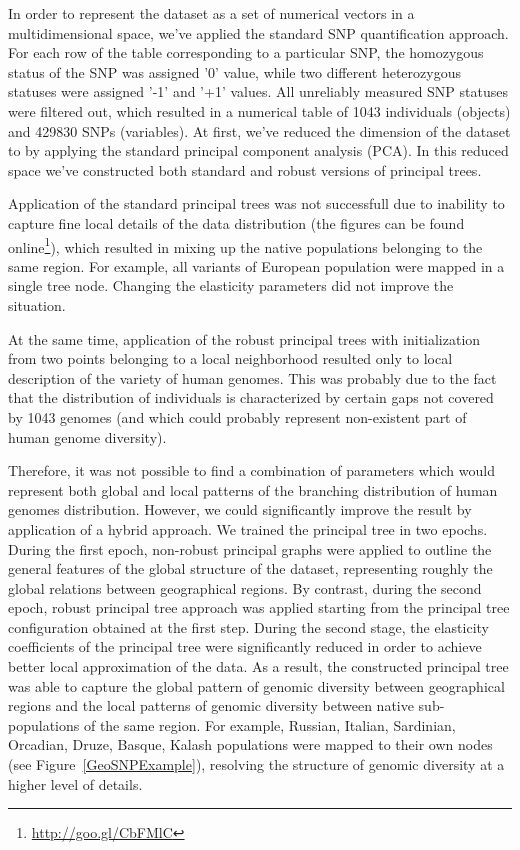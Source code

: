 \documentclass[graybox]{archivesofdatascience}
\begin{document}
In order to represent the dataset as a set of numerical vectors in a multidimensional space, we've applied the standard SNP quantification approach. For each row of the table corresponding to a particular SNP, the homozygous status of the SNP was assigned '0' value, while two different heterozygous statuses were assigned '-1' and '+1' values. All unreliably measured SNP statuses were filtered out, which resulted in a numerical table of 1043 individuals (objects) and 429830 SNPs (variables). At first, we've reduced the dimension of the dataset to  by applying the standard principal component analysis (PCA). In this reduced space we've constructed both standard and robust versions of principal trees.

Application of the standard principal trees was not successfull due to inability to capture fine local details of the data distribution (the figures can be found online\footnote{\url{http://goo.gl/CbFMlC}}), which resulted in mixing up the native populations belonging to the same region. For example, all variants of European population were mapped in a single tree node. Changing the elasticity parameters did not improve the situation.

At the same time, application of the robust principal trees with initialization from two points belonging to a local neighborhood resulted only to local description of the variety of human genomes. This was probably due to the fact that the distribution of individuals is characterized by certain gaps not covered by 1043 genomes (and which could probably represent non-existent part of human genome diversity).

Therefore, it was not possible to find a combination of parameters which would represent both global and local patterns of the branching distribution of human genomes distribution. 
However, we could significantly improve the result by application of a hybrid approach. 
We trained the principal tree in two epochs. During the first epoch,  non-robust principal graphs were applied to outline the general features of the global structure of the dataset, representing roughly the global relations between geographical regions. 
By contrast, during the second epoch, robust principal tree approach was applied starting from the principal tree configuration obtained at the first step. 
During the second stage, the elasticity coefficients of the principal tree were significantly reduced in order to achieve better local approximation of the data. 
As a result, the constructed principal tree was able to capture the global pattern of genomic diversity between geographical regions and the local patterns of genomic diversity between native sub-populations of the same region. 
For example, Russian, Italian, Sardinian, Orcadian, Druze, Basque, Kalash populations were mapped to their own nodes (see Figure~\ref{GeoSNPExample}), resolving the structure of genomic diversity at a higher level of details.
\end{document}
